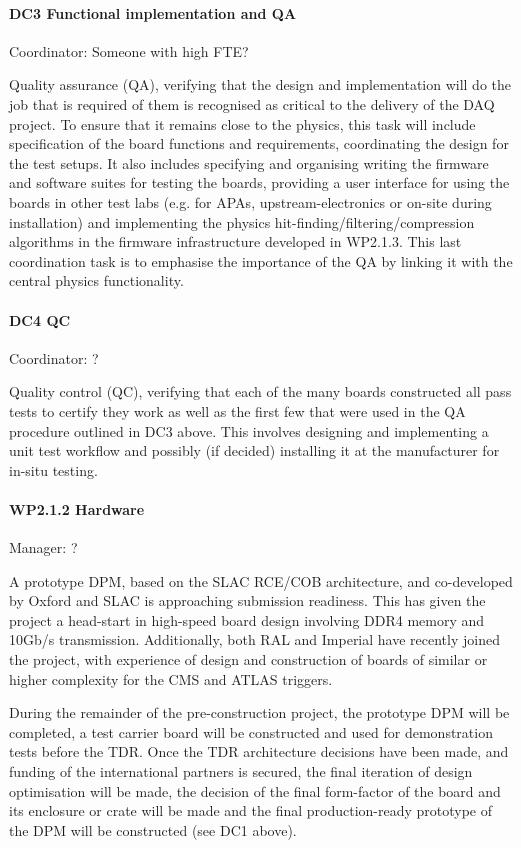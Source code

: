 \paragraph{DC\/3 Functional implementation and QA} Coordinator: Someone with high FTE?

\noindent
Quality assurance (QA), verifying that the design and implementation will do
the job that is required of them is recognised as critical to the delivery 
of the DAQ project.  To ensure that it remains close to the physics, this 
task will include specification of the board functions and requirements, 
coordinating the design for the test setups.  It also includes specifying 
and organising writing the firmware and software suites for testing the 
boards, providing a user interface for using the boards in other test 
labs (e.g. for APAs, upstream-electronics or on-site during installation) and implementing the physics hit-finding/filtering/compression algorithms in the firmware infrastructure developed in WP2.1.3.  This last coordination task is to emphasise
the importance of the QA by linking it with the central physics functionality.

\paragraph{DC\/4 QC} Coordinator: ?

\noindent
Quality control (QC), verifying that each of the many boards constructed all
pass tests to certify they work as well as the first few that were used 
in the QA procedure outlined in DC\/3 above.  This involves designing 
and implementing a unit test workflow and possibly (if decided) installing 
it at the manufacturer for in-situ testing.  

\paragraph{WP2.1.2 Hardware} Manager: ?

\noindent
A prototype DPM, based on the SLAC RCE/COB architecture, and co-developed 
by Oxford and SLAC is approaching submission readiness.  This has given 
the project a head-start in high-speed board design involving DDR4 memory 
and 10Gb/s transmission.  Additionally, both RAL and Imperial have recently 
joined the project, with experience of design and construction of boards 
of similar or higher complexity for the CMS and ATLAS triggers.

During the remainder of the pre-construction project, the prototype DPM will
be completed, a test carrier board will be constructed and used for 
demonstration tests before the TDR.   Once the TDR architecture decisions 
have been made, and funding of the international partners is secured, the 
final iteration of design optimisation will be made, the decision of the final
form-factor of the board and its enclosure or crate will be made and the final
production-ready prototype of the DPM will be constructed (see DC\/1 above).

